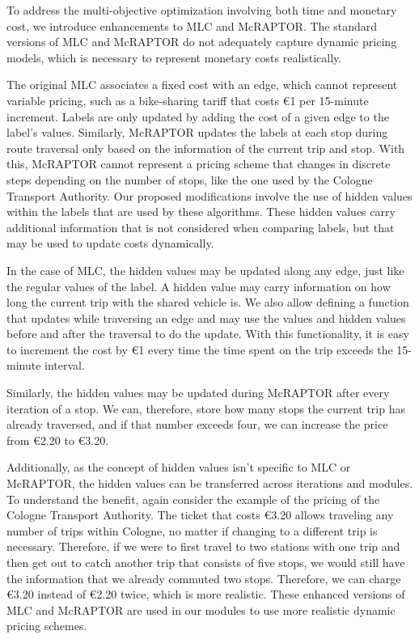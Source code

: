 To address the multi-objective optimization involving both time and monetary cost, we introduce enhancements to MLC and McRAPTOR. 
The standard versions of MLC and McRAPTOR do not adequately capture dynamic pricing models, which is necessary to represent monetary costs realistically.

The original MLC associates a fixed cost with an edge, which cannot represent variable pricing, such as a bike-sharing tariff that costs \euro{1} per 15-minute increment. 
Labels are only updated by adding the cost of a given edge to the label's values.
Similarly, McRAPTOR updates the labels at each stop during route traversal only based on the information of the current trip and stop. 
With this, McRAPTOR cannot represent a pricing scheme that changes in discrete steps depending on the number of stops, like the one used by the Cologne Transport Authority.
Our proposed modifications involve the use of hidden values within the labels that are used by these algorithms. 
These hidden values carry additional information that is not considered when comparing labels, but that may be used to update costs dynamically.

In the case of MLC, the hidden values may be updated along any edge, just like the regular values of the label.
A hidden value may carry information on how long the current trip with the shared vehicle is.
We also allow defining a function that updates while traversing an edge and may use the values and hidden values before and after the traversal to do the update.
With this functionality, it is easy to increment the cost by \euro{1} every time the time spent on the trip exceeds the 15-minute interval.

Similarly, the hidden values may be updated during McRAPTOR after every iteration of a stop.
We can, therefore, store how many stops the current trip has already traversed, and if that number exceeds four, we can increase the price from \euro{2.20} to \euro{3.20}.

Additionally, as the concept of hidden values isn't specific to MLC or McRAPTOR, the hidden values can be transferred across iterations and modules.
To understand the benefit, again consider the example of the pricing of the Cologne Transport Authority.
The ticket that costs \euro{3.20} allows traveling any number of trips within Cologne, no matter if changing to a different trip is necessary.
Therefore, if we were to first travel to two stations with one trip and then get out to catch another trip that consists of five stops, we would still have the information that we already commuted two stops.
Therefore, we can charge \euro{3.20} instead of \euro{2.20} twice, which is more realistic.
These enhanced versions of MLC and McRAPTOR are used in our modules to use more realistic dynamic pricing schemes.

